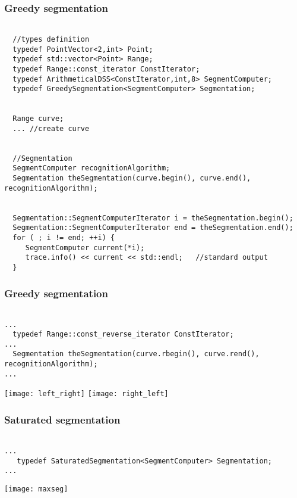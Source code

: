 \begin{frame}[fragile]
  \frametitle{Greedy segmentation}

\begin{verbatim}

  //types definition
  typedef PointVector<2,int> Point;
  typedef std::vector<Point> Range;
  typedef Range::const_iterator ConstIterator;
  typedef ArithmeticalDSS<ConstIterator,int,8> SegmentComputer;
  typedef GreedySegmentation<SegmentComputer> Segmentation;


  Range curve;
  ... //create curve


  //Segmentation
  SegmentComputer recognitionAlgorithm;
  Segmentation theSegmentation(curve.begin(), curve.end(), recognitionAlgorithm);

                                 
  Segmentation::SegmentComputerIterator i = theSegmentation.begin();
  Segmentation::SegmentComputerIterator end = theSegmentation.end();
  for ( ; i != end; ++i) {
     SegmentComputer current(*i);
     trace.info() << current << std::endl;   //standard output
  }

\end{verbatim}


\end{frame}


\begin{frame}[fragile]
  \frametitle{Greedy segmentation}

\begin{verbatim}

...
  typedef Range::const_reverse_iterator ConstIterator;
...
  Segmentation theSegmentation(curve.rbegin(), curve.rend(), recognitionAlgorithm);
...

\end{verbatim}

 \begin{center}
   \texttt{[image: left\_right]}
   \texttt{[image: right\_left]}
 \end{center}

\end{frame}

\begin{frame}[fragile]

  \frametitle{Saturated segmentation}

\begin{verbatim}

...
   typedef SaturatedSegmentation<SegmentComputer> Segmentation;
...

\end{verbatim}

 \begin{center}
   \texttt{[image: maxseg]}
 \end{center}

\end{frame}

